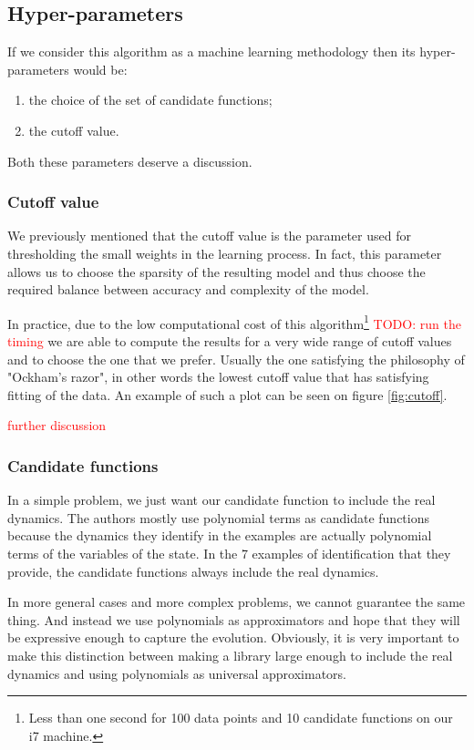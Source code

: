 \documentclass[12pt, letterpaper]{article}
\newcommand{\com}[1]{{\small {\fontfamily{ptm} \selectfont \textcolor{red}{#1}}}}
\begin{document}
\subsection{Hyper-parameters}

If we consider this algorithm as a machine learning methodology then its hyper-parameters would be:
\begin{enumerate} 
    \item the choice of the set of candidate functions;
    \item the cutoff value.
\end{enumerate}

Both these parameters deserve a discussion.

\subsubsection{Cutoff value}

We previously mentioned that the cutoff value is the parameter used for thresholding the small weights in the learning process. 
In fact, this parameter allows us to choose the sparsity of the resulting model and thus choose the required balance between accuracy and complexity of the model.

In practice, due to the low computational cost of this algorithm\footnote{Less than one second for 100 data points and 10 candidate functions on our i7 machine.} \com{TODO: run the timing} we are able to compute the results for a very wide range of cutoff values and to choose the one that we prefer. 
Usually the one satisfying the philosophy of "Ockham's razor", in other words the lowest cutoff value that has satisfying fitting of the data. 
An example of such a plot can be seen on figure \ref{fig:cutoff}. 

\com{further discussion}

\subsubsection{Candidate functions}\label{sec:polynomials}

In a simple problem, we just want our candidate function to include the real dynamics. 
The authors mostly use polynomial terms as candidate functions because the dynamics they identify in the examples are actually polynomial terms of the variables of the state. 
In the 7 examples of identification that they provide, the candidate functions always include the real dynamics. 

In more general cases and more complex problems, we cannot guarantee the same thing. 
And instead we use polynomials as approximators and hope that they will be expressive enough to capture the evolution. 
Obviously, it is very important to make this distinction between making a library large enough to include the real dynamics and using polynomials as universal approximators. 
\end{document}
